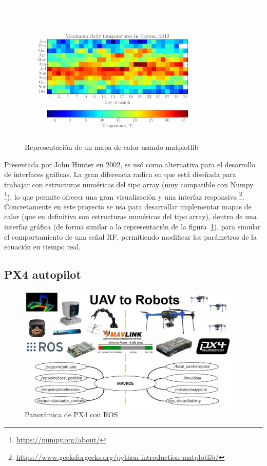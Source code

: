\begin{figure} [t]
	\begin{center}
	\includegraphics[height=7cm]{imagenes/cap3/6_matplotlib_app.png}
	\end{center}
	\caption[Representación de un mapa de calor usando matplotlib]{Representación de un mapa de calor usando matplotlib}
	\label{fig:matplotlib}
\end{figure}

Presentada por John Hunter en 2002, se usó como alternativa para el desarrollo de interfaces gráficas. La gran diferencia radica en que está diseñada para trabajar con estructuras numéricas del tipo array (muy compatible con Numpy \footnote[12]{\url{https://numpy.org/about/}}), lo que permite ofrecer una gran visualización y una interfaz responsiva \footnote[13]{\url{https://www.geeksforgeeks.org/python-introduction-matplotlib/}}.\\

Concretamente en este proyecto se usa para desarrollar implementar mapas de calor (que en definitiva son estructuras numéricas del tipo array), dentro de una interfaz gráfica (de forma similar a la representación de la figura~\ref{fig:matplotlib}), para simular el comportamiento de una señal \ac{RF}, permitiendo modificar los parámetros de la ecuación en tiempo real.

\subsection{PX4 autopilot}
\label{subsec:px4}

\begin{figure} [tp]
	\begin{center}
	\includegraphics[height=6cm]{imagenes/cap3/7_px4_logo.jpeg}
	\end{center}
	\caption[Panorámica de PX4 con \ac{ROS}]{Panorámica de PX4 con \ac{ROS}}
	\label{fig:px4autopilot}
\end{figure}

